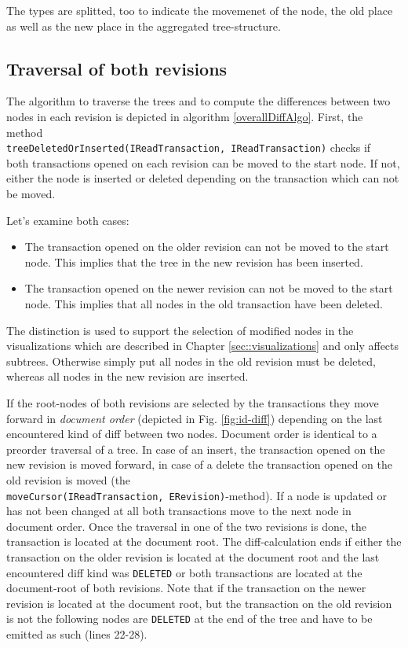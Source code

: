 The types are splitted, too to indicate the movemenet of the node, the old place as well as the new place in the aggregated tree-structure.

\subsection{Traversal of both revisions}
The algorithm to traverse the trees and to compute the differences between two nodes in each revision is depicted in algorithm \ref{overallDiffAlgo}. First, the method\\ \texttt{treeDeletedOrInserted(IReadTransaction, IReadTransaction)} checks if\\ both transactions opened on each revision can be moved to the start node. If not, either the node is inserted or deleted depending on the transaction which can not be moved.

Let's examine both cases:
\begin{itemize}
\item
The transaction opened on the older revision can not be moved to the start node. This implies that the tree in the new revision has been inserted.
\item
The transaction opened on the newer revision can not be moved to the start node. This implies that all nodes in the old transaction have been deleted.
\end{itemize}

The distinction is used to support the selection of modified nodes in the visualizations which are described in Chapter \ref{sec::visualizations} and only affects subtrees. Otherwise simply put all nodes in the old revision must be deleted, whereas all nodes in the new revision are inserted.

If the root-nodes of both revisions are selected by the transactions they move forward in \emph{document order} (depicted in Fig. \ref{fig:id-diff}) depending on the last encountered kind of diff between two nodes. Document order is identical to a preorder traversal of a tree. In case of an insert, the transaction opened on the new revision is moved forward, in case of a delete the transaction opened on the old revision is moved (the \\ \texttt{moveCursor(IReadTransaction, ERevision)}-method). If a node is updated or has not been changed at all both transactions move to the next node in document order. Once the traversal in one of the two revisions is done, the transaction is located at the document root. The diff-calculation ends if either the transaction on the older revision is located at the document root and the last encountered diff kind was \texttt{DELETED} or both transactions are located at the document-root of both revisions. Note that if the transaction on the newer revision is located at the document root, but the transaction on the old revision is not the following nodes are \texttt{DELETED} at the end of the tree and have to be emitted as such (lines 22-28). 

